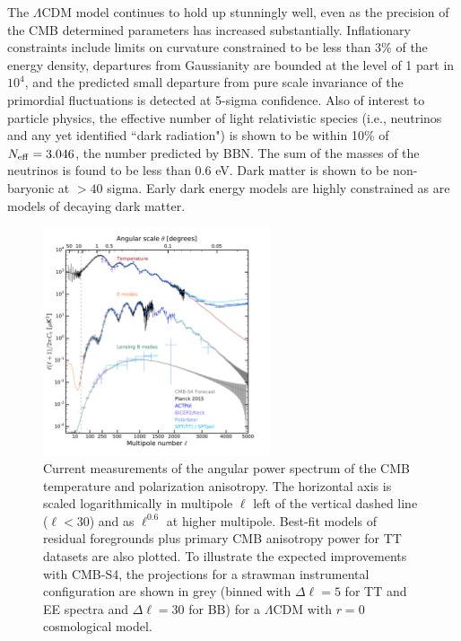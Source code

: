 The $\Lambda$CDM model continues to hold up stunningly well, even as the precision of the CMB determined parameters has increased substantially. Inflationary constraints include limits on curvature constrained to be less than 3\% of the energy density,
departures from Gaussianity are bounded at the level of 1 part in $10^4$,
and 
the predicted small departure from pure scale invariance of the primordial fluctuations is detected at 5-sigma confidence. Also of interest to particle physics, the effective number of light relativistic species (i.e., neutrinos and any yet identified ``dark radiation") is shown to be within 10\% of $N_\mathrm{eff} = 3.046$, the number predicted by BBN.  The sum of the masses of the neutrinos is found to be less than 0.6 eV. Dark matter is shown to be non-baryonic at $> 40$ sigma. Early dark energy models are highly constrained as are models of decaying dark matter. 

\begin{figure}[t]
\centering \includegraphics[width=0.6\textwidth]{Intro/CurrentCMB_withcmbs4.pdf}
\caption{Current measurements of the angular power spectrum of the CMB temperature and polarization anisotropy. The horizontal axis is scaled logarithmically in multipole $\ell$ left of the vertical dashed line ($\ell < 30$) and as $\ell^{0.6}$ at higher multipole.  Best-fit models of residual foregrounds plus primary CMB anisotropy power for TT datasets are also plotted. To illustrate the expected improvements with CMB-S4, the projections for a strawman instrumental configuration are shown in grey (binned with $\Delta\ell = 5$ for TT and EE spectra and $\Delta\ell = 30$ for BB) for a $\Lambda$CDM with $r =0$ cosmological model.}
\label{fig:CurrentCMB}
\end{figure}

